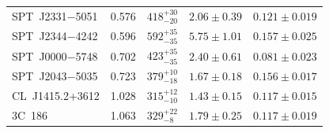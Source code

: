 \begin{table}
\begin{tabular}{lclcc}
    SPT~J2331$-$5051     &  0.576  &  $418^{+30}_{-20}$  &                $2.06\pm0.39$   &  $0.121\pm0.019$\vspace{0.5ex}\\ 
    SPT~J2344$-$4242     &  0.596  &  $592^{+35}_{-35}$  &                $5.75\pm1.01$   &  $0.157\pm0.025$\vspace{0.5ex}\\ 
    SPT~J0000$-$5748     &  0.702  &  $423^{+35}_{-35}$  &                $2.40\pm0.61$   &  $0.081\pm0.023$\vspace{0.5ex}\\ 
    SPT~J2043$-$5035     &  0.723  &  $379^{+10}_{-18}$  &                $1.67\pm0.18$   &  $0.156\pm0.017$\vspace{0.5ex}\\ 
    CL~J1415.2+3612      &  1.028  &  $315^{+12}_{-10}$  &                $1.43\pm0.15$   &  $0.117\pm0.015$\vspace{0.5ex}\\
    3C~186               &  1.063  &  $329^{+22}_{-8}$   &                $1.79\pm0.25$   &  $0.117\pm0.019$\\ 
    \hline
  \end{tabular}
\end{table}
